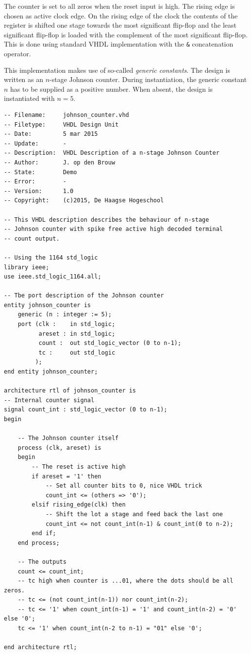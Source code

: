 \documentclass[12pt,a4paper,final,twoside,fleqn]{article}
\begin{document}
The counter is set to all zeros when the reset input is high. The rising edge is chosen
as active clock edge. On the rising edge of the clock the contents of the register is
shifted one stage towards the most significant flip-flop and the least significant
flip-flop is loaded with the complement of the most significant flip-flop. This is done
using standard VHDL implementation with the \lstinline|&| concatenation operator.

This implementation makes use of so-called \textsl{generic constants}. The design is
written as an $n$-stage Johnson counter. During instantiation, the generic constant
$n$ has to be supplied as a positive number. When absent, the design is instantiated
with $n=5$.

\medskip
\begin{lstlisting}[caption=A VHDL description of an n-stage Johnson counter,label=cod:johnson]
-- Filename:     johnson_counter.vhd
-- Filetype:     VHDL Design Unit
-- Date:         5 mar 2015
-- Update:       -
-- Description:  VHDL Description of a n-stage Johnson Counter
-- Author:       J. op den Brouw
-- State:        Demo
-- Error:        -
-- Version:      1.0
-- Copyright:    (c)2015, De Haagse Hogeschool

-- This VHDL description describes the behaviour of n-stage
-- Johnson counter with spike free active high decoded terminal
-- count output.

-- Using the 1164 std_logic
library ieee;
use ieee.std_logic_1164.all;

-- Tbe port description of the Johnson counter
entity johnson_counter is
    generic (n : integer := 5);
    port (clk :    in std_logic;
          areset : in std_logic;
          count :  out std_logic_vector (0 to n-1);
          tc :     out std_logic
         );
end entity johnson_counter;

architecture rtl of johnson_counter is
-- Internal counter signal
signal count_int : std_logic_vector (0 to n-1);
begin

    -- The Johnson counter itself
    process (clk, areset) is
    begin
        -- The reset is active high
        if areset = '1' then
            -- Set all counter bits to 0, nice VHDL trick
            count_int <= (others => '0');
        elsif rising_edge(clk) then
            -- Shift the lot a stage and feed back the last one
            count_int <= not count_int(n-1) & count_int(0 to n-2);
        end if;
    end process;
    
    -- The outputs
    count <= count_int;
    -- tc high when counter is ...01, where the dots should be all zeros.
    -- tc <= (not count_int(n-1)) nor count_int(n-2);
    -- tc <= '1' when count_int(n-1) = '1' and count_int(n-2) = '0' else '0';
    tc <= '1' when count_int(n-2 to n-1) = "01" else '0';
	 
end architecture rtl;
\end{lstlisting}
\end{document}
